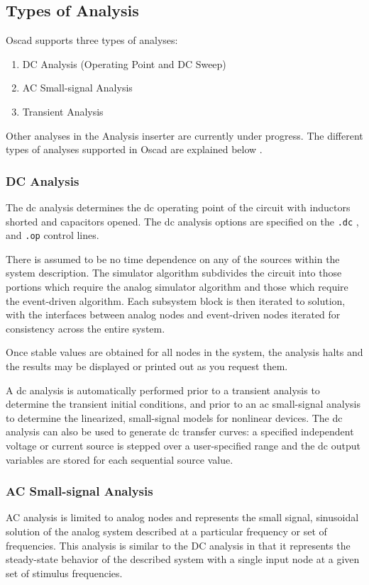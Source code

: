 \subsection{Types of Analysis} 
Oscad supports three types of analyses:
\begin{enumerate}
\item DC Analysis (Operating Point and DC Sweep) 
\item AC Small-signal Analysis  
\item Transient Analysis 
\end{enumerate}
Other analyses in the Analysis inserter are currently under progress.
The different types of analyses supported in Oscad are explained below \cite{ngspice}.
\subsubsection{DC Analysis} 
The dc analysis determines the dc operating point of the circuit with inductors shorted and capacitors opened. The dc analysis options are specified on the {\tt .dc} , and {\tt .op} control lines. 

There is assumed to be no time dependence on any of the sources within the system description. The simulator algorithm subdivides the circuit into those portions which require the analog simulator algorithm and those which require the event-driven algorithm. Each subsystem block is then iterated to solution, with the interfaces between analog nodes and event-driven nodes iterated for consistency across the entire system. 

Once stable values are obtained for all nodes in the system, the analysis halts and the results may be displayed or printed out as you request them.
 
A dc analysis is automatically performed prior to a transient analysis to determine the transient initial conditions, and prior to an ac small-signal analysis to determine the linearized, small-signal models for nonlinear devices. 
 The dc analysis can also be used to generate dc transfer curves: a specified independent voltage or current source is stepped over a user-specified range and the dc output variables are stored for each sequential source value. 
\subsubsection{AC Small-signal Analysis}
AC analysis is limited to analog nodes and represents the small signal, sinusoidal solution of the analog system described at a particular frequency or set of frequencies. This analysis is similar to the DC analysis in that it represents the steady-state behavior of the described system with a single input node at a given set of stimulus frequencies. 

